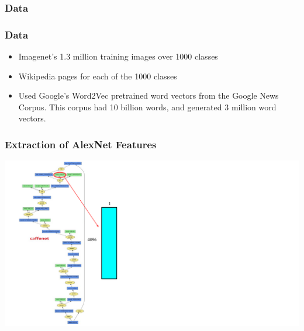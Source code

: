\documentclass{beamer}
\begin{document}
\begin{frame}
  \frametitle{Data}
\end{frame}

\begin{frame}
  \frametitle{Data}
  \begin{itemize}
  \item Imagenet's 1.3 million training images over 1000 classes
  \item Wikipedia pages for each of the 1000 classes
  \item Used Google's Word2Vec pretrained word vectors from the Google News Corpus.
	This corpus had 10 billion words, and generated 3 million word vectors.
  \end{itemize}
\end{frame}

\begin{frame}
  \frametitle{Extraction of AlexNet Features}
  \begin{center}
    \includegraphics[height=0.9\textheight]{assets/CaffeNetFeatures.pdf}
  \end{center}
\end{frame}
\end{document}
